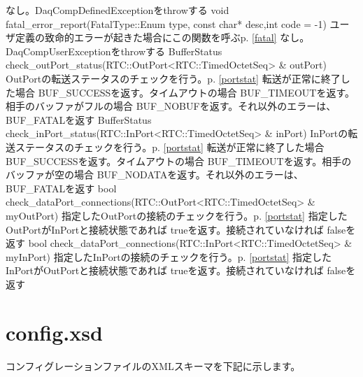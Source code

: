\documentclass[a4j,10pt,dvips,onecolumn,oneside,final]{jarticle}%
\begin{document}
       {なし。DaqCompDefinedExceptionをthrowする}
       {}
       {void fatal\_error\_report(FatalType::Enum type, const char* desc,int code = -1) }
       {ユーザ定義の致命的エラーが起きた場合にこの関数を呼ぶp.\pageref{fatal} \ref{fatal}}
       {なし。DaqCompUserExceptionをthrowする}
       {}
       {BufferStatus check\_outPort\_status(RTC::OutPort<RTC::TimedOctetSeq> \& outPort) }
       {OutPortの転送ステータスのチェックを行う。p.\pageref{portstat} \ref{portstat}}
       {転送が正常に終了した場合 BUF\_SUCCESSを返す。タイムアウトの場合 BUF\_TIMEOUTを返す。相手のバッファがフルの場合
       BUF\_NOBUFを返す。それ以外のエラーは、BUF\_FATALを返す}
       {}
       {BufferStatus check\_inPort\_status(RTC::InPort<RTC::TimedOctetSeq> \& inPort) }
       {InPortの転送ステータスのチェックを行う。p.\pageref{portstat} \ref{portstat}}
       {転送が正常に終了した場合 BUF\_SUCCESSを返す。タイムアウトの場合 BUF\_TIMEOUTを返す。相手のバッファが空の場合
       BUF\_NODATAを返す。それ以外のエラーは、BUF\_FATALを返す}
       {}
       {bool check\_dataPort\_connections(RTC::OutPort<RTC::TimedOctetSeq> \& myOutPort)}
       {指定したOutPortの接続のチェックを行う。p.\pageref{portstat} \ref{portstat}}
       {指定したOutPortがInPortと接続状態であれば trueを返す。接続されていなければ falseを返す}
       {}
       {bool check\_dataPort\_connections(RTC::InPort<RTC::TimedOctetSeq> \& myInPort)}
       {指定したInPortの接続のチェックを行う。p.\pageref{portstat} \ref{portstat}}
       {指定したInPortがOutPortと接続状態であれば trueを返す。接続されていなければ falseを返す}
       {}
\newpage
\section{config.xsd}\label{config.xsd}
コンフィグレーションファイルのXMLスキーマを下記に示します。
\end{document}
